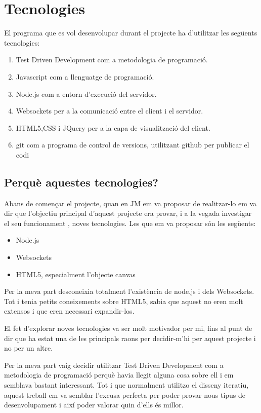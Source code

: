 \chapter{Tecnologies}
\label{sec:tecnologies}

El programa que es vol desenvolupar durant el projecte ha d'utilitzar les següents tecnologies: 

\begin{enumerate}
	\item{Test Driven Development com a metodologia de programació.}
	\item{Javascript com a llenguatge de programació.}
	\item{Node.js com a entorn d'execució del servidor.}
	\item{Websockets per a la comunicació entre el client i el servidor.}
	\item{HTML5,CSS i JQuery per a la capa de visualització del client.}
	\item{git com a programa de control de versions, utilitzant github per publicar el codi}
\end{enumerate}

\section{Perquè aquestes tecnologies?}

Abans de començar el projecte, quan en JM em va proposar de realitzar-lo em va dir que l'objectiu principal d'aquest projecte era provar, i a la vegada investigar el seu funcionament , noves tecnologies. Les que em va proposar són les següents: 
\begin{itemize}
	\item{Node.js}
	\item{Websockets}
	\item{HTML5, especialment l'objecte canvas}
\end{itemize}

Per la meva part desconeixia totalment l'existència de node.js i dels Websockets. Tot i tenia petits coneixements sobre HTML5, sabia que aquest no eren molt extensos i que eren necessari expandir-los.

El fet d'explorar noves tecnologies va ser molt motivador per mi, fins al punt de dir que ha estat una de les principals raons per decidir-m'hi per aquest projecte i no per un altre. 

Per la meva part vaig decidir utilitzar Test Driven Development com a metodologia de programació perquè havia llegit alguna cosa sobre ell i em semblava bastant interessant. Tot i que normalment utilitzo el disseny iteratiu, aquest treball em va semblar l'excusa perfecta per poder provar nous tipus de desenvolupament i així poder valorar quin d'ells és millor. 


